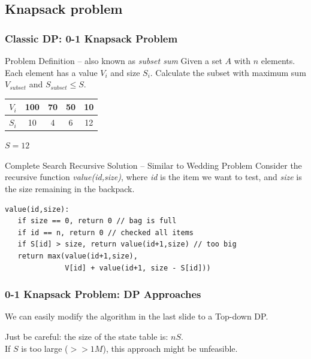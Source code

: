 \documentclass{beamer}
\begin{document}
\subsection{Knapsack problem}
\begin{frame}[fragile]
  \frametitle{Classic DP: 0-1 Knapsack Problem}
  {\smaller
  \begin{block}{Problem Definition -- also known as \emph{subset sum}}
    Given a set $A$ with $n$ elements. Each element has a value $V_i$
    and size $S_i$. Calculate the subset with maximum sum
    $V_{subset}$ and $S_{subset} \leq S$.
  \end{block}

  \medskip

  \begin{tabular}{|c|c|c|c|c|}
    \hline
    $V_i$ & 100 & 70 & 50 & 10\\
    \hline
    $S_i$ & 10 & 4 & 6 & 12\\
    \hline
  \end{tabular}
  
  \smallskip
  
  $S = 12$

  \begin{block}{Complete Search Recursive Solution -- Similar to Wedding Problem}
    Consider the recursive function \emph{value(id,size)}, where
    \emph{id} is the item we want to test, and \emph{size} is the size
    remaining in the backpack.

    \medskip

\begin{verbatim}
value(id,size):
   if size == 0, return 0 // bag is full
   if id == n, return 0 // checked all items
   if S[id] > size, return value(id+1,size) // too big
   return max(value(id+1,size), 
              V[id] + value(id+1, size - S[id]))
\end{verbatim}
  \end{block}
  }
\end{frame}

\begin{frame}
  \frametitle{0-1 Knapsack Problem: DP Approaches} 

  {\small 
    We can easily modify the algorithm in the last slide to a Top-down
    DP.

    \bigskip

    \alert{Just be careful}: the size of the state table is: $nS$.\\ 
    If $S$ is too large ($>>1M$), this approach might be unfeasible.
  }
\end{frame}
\end{document}
